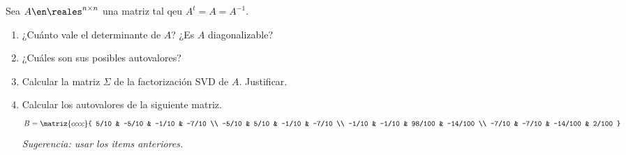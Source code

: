 \begin{enunciado}{\ejExtra} 
  Sea $A \en \reales^{n \times n}$ una matriz tal qeu $A^t = A = A^{-1}$.
  \begin{enumerate}[label=\alph*)]
    \item ¿Cuánto vale el determinante de $A$? ¿Es $A$ diagonalizable?
    \item ¿Cuáles son sus posibles autovalores?
    \item Calcular la matriz $\Sigma$ de la factorización SVD de $A$. Justificar.
    \item Calcular los autovalores de la siguiente matriz.
          $$
            B =
            \matriz{cccc}{
              5/10 & -5/10 & -1/10 & -7/10 \\
              -5/10 & 5/10 & -1/10 & -7/10 \\
              -1/10 & -1/10 & 98/100 & -14/100 \\
              -7/10 & -7/10 & -14/100 & 2/100
            }
          $$
          \textit{Sugerencia: usar los items anteriores.}
  \end{enumerate}
\end{enunciado}

